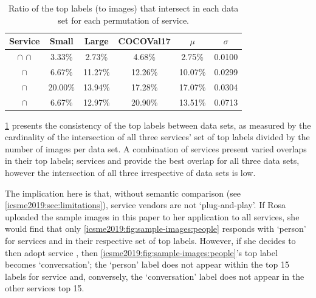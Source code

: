 \begin{table}[t]
\caption[Ratio of consistent labels in CV services]{Ratio of the top labels (to images) that intersect in each data set for each permutation of service.}
\label{icsme2019:tab:intersect-of-labels}
\centering
\begin{tabular}{c||c|c|c||c|c}
  \toprule
  \textbf{Service} & \textbf{Small} & \textbf{Large} & \textbf{COCOVal17} & \textbf{$\mu$} & \textbf{$\sigma$} \\
  \midrule
  \googleapi{} $\cap$ \azureapi{} $\cap$ \awsapi{}  & 3.33\%   & 2.73\%   & 4.68\%   & 2.75\%  & 0.0100  \\
  \googleapi{} $\cap$ \azureapi{}                   & 6.67\%   & 11.27\%  & 12.26\%  & 10.07\% & 0.0299 \\
  \googleapi{} $\cap$ \awsapi{}                     & 20.00\%  & 13.94\%  & 17.28\%  & 17.07\% & 0.0304 \\
  \azureapi{} $\cap$ \awsapi{}                      & 6.67\%   & 12.97\%  & 20.90\%  & 13.51\% & 0.0713 \\
  \bottomrule
\end{tabular}
\end{table}

\cref{icsme2019:tab:intersect-of-labels} presents the consistency of the top labels between data sets, as measured by the cardinality of the intersection of all three services' set of top labels divided by the number of images per data set. A combination of services present varied overlaps in their top labels; services \googleapi{} and \awsapi{} provide the best overlap for all three data sets, however the intersection of all three irrespective of data sets is low.



The implication here is that, without semantic comparison (see \cref{icsme2019:sec:limitations}), service vendors are not `plug-and-play'. If Rosa uploaded the sample images in this paper to her application to all services, she would find that only \cref{icsme2019:fig:sample-images:people} responds with `person' for services  \azureapi{} and \awsapi{} in their respective set of top labels. However, if she decides to then adopt service \googleapi{}, then \cref{icsme2019:fig:sample-images:people}'s top label becomes `conversation'; the `person' label does not appear within the top 15 labels for service \googleapi{} and, conversely, the `conversation' label does not appear in the other services top 15. 

